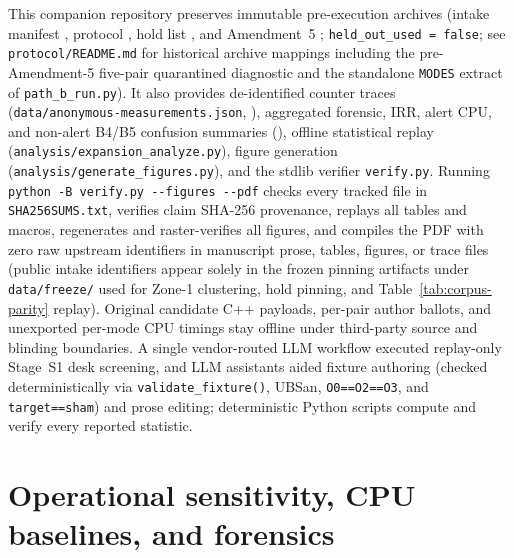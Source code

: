 \documentclass[11pt]{article}
\begin{document}
This companion repository preserves immutable pre-execution archives (intake manifest \BenchPinManifest{}, protocol \BenchPinProtocol{}, hold list \BenchPinHolds{}, and Amendment~5 \BenchPinAmendFive{}; \texttt{held\_out\_used = false}; see \texttt{protocol/README.md} for historical archive mappings including the pre-Amendment-5 five-pair quarantined diagnostic and the standalone \texttt{MODES} extract of \texttt{path\_b\_run.py}).
It also provides de-identified counter traces (\texttt{data/\allowbreak anonymous-\allowbreak measurements.json}, \BenchPinAnon{}), aggregated forensic, IRR, alert CPU, and non-alert B4/B5 confusion summaries (\BenchPinForensics{}), offline statistical replay (\texttt{analysis/\allowbreak expansion\_\allowbreak analyze.py}), figure generation (\texttt{analysis/\allowbreak generate\_\allowbreak figures.py}), and the stdlib verifier \texttt{verify.py}.
Running \texttt{python -B verify.py -{}-figures -{}-pdf} checks every tracked file in \texttt{SHA256SUMS.txt}, verifies claim SHA-256 provenance, replays all tables and macros, regenerates and raster-verifies all figures, and compiles the PDF with zero raw upstream identifiers in manuscript prose, tables, figures, or trace files (public intake identifiers appear solely in the frozen pinning artifacts under \texttt{data/freeze/} used for Zone-1 clustering, hold pinning, and Table~\ref{tab:corpus-parity} replay).
Original candidate C++ payloads, per-pair author ballots, and unexported per-mode CPU timings stay offline under third-party source and blinding boundaries.
A single vendor-routed LLM workflow executed replay-only Stage~S1 desk screening, and LLM assistants aided fixture authoring (checked deterministically via \texttt{validate\_fixture()}, UBSan, \texttt{O0==O2==O3}, and \texttt{target==sham}) and prose editing; deterministic Python scripts compute and verify every reported statistic.

{\small


}

\clearpage
\appendix
\renewcommand{\thetable}{A\arabic{table}}
\setcounter{table}{0}
\setlength{\intextsep}{6pt plus 1pt minus 1pt}
\section{Operational sensitivity, CPU baselines, and forensics}
\label{app:sensitivity}
\end{document}
